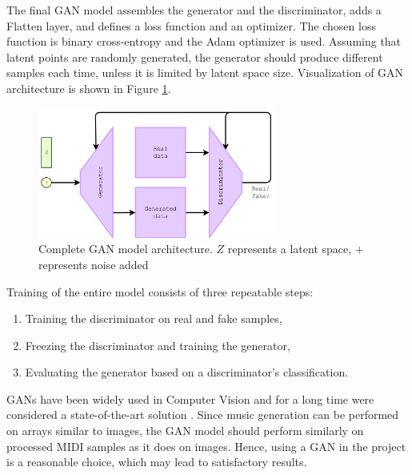 \documentclass[a4paper, 11pt, twoside]{report}
\theoremstyle{definition}
\begin{document}
The final GAN model assembles the generator and the discriminator, adds a \textit{}{Flatten layer}, and defines a loss function and an optimizer. The chosen loss function is binary cross-entropy and the \textit{}{Adam} optimizer is used. Assuming that latent points are randomly generated, the generator should produce different samples each time, unless it is limited by latent space size. Visualization of GAN architecture is shown in Figure \ref{fig:GAN}. \par

\begin{figure}[H]
    \begin{center}
        \includegraphics[width=0.7\textwidth]{assets/GAN_v2.png}
        \caption{Complete GAN model architecture. $Z$ represents a latent space, $+$ represents noise added}
        \label{fig:GAN}
    \end{center}
\end{figure}

Training of the entire model consists of three repeatable steps:

\begin{enumerate}
    \item Training the discriminator on real and fake samples,
    \item Freezing the discriminator and training the generator,
    \item Evaluating the generator based on a discriminator's classification.
\end{enumerate} \par

GANs have been widely used in Computer Vision and for a long time were considered a state-of-the-art solution \cite{GAN_SOTA}. Since music generation can be performed on arrays similar to images, the GAN model should perform similarly on processed MIDI samples as it does on images. Hence, using a GAN in the project is a reasonable choice, which may lead to satisfactory results. \par
\end{document}
